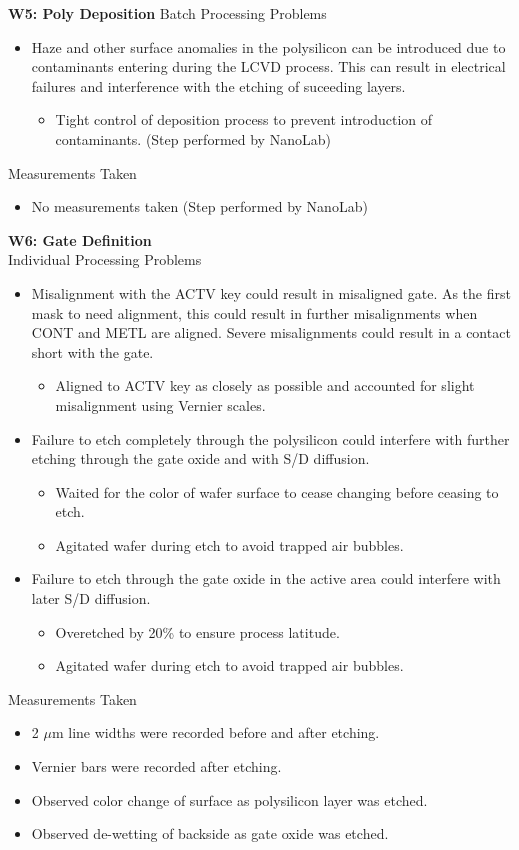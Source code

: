 \documentclass{article}
\begin{document}
\textbf{W5: Poly Deposition}
Batch Processing Problems
\begin{itemize}
\item Haze and other surface anomalies in the polysilicon can be introduced due to contaminants entering during the LCVD process. This can result in electrical failures and interference with the etching of suceeding layers.
	\begin{itemize}
	\item Tight control of deposition process to prevent introduction of contaminants. (Step performed by NanoLab)
	\end{itemize}
\end{itemize}
Measurements Taken
\begin{itemize}
\item No measurements taken (Step performed by NanoLab)
\end{itemize}

\textbf{W6: Gate Definition} \\
Individual Processing Problems
\begin{itemize}
\item Misalignment with the ACTV key could result in misaligned gate. As the first mask to need alignment, this could result in further misalignments when CONT and METL are aligned. Severe misalignments could result in a contact short with the gate.
	\begin{itemize}
	\item Aligned to ACTV key as closely as possible and accounted for slight misalignment using Vernier scales.
	\end{itemize}
\item Failure to etch completely through the polysilicon could interfere with further etching through the gate oxide and with S/D diffusion.
	\begin{itemize}
	\item Waited for the color of wafer surface to cease changing before ceasing to etch.
	\item Agitated wafer during etch to avoid trapped air bubbles.
	\end{itemize}
\item Failure to etch through the gate oxide in the active area could interfere with later S/D diffusion.
	\begin{itemize}
	\item Overetched by 20\% to ensure process latitude.  
	\item Agitated wafer during etch to avoid trapped air bubbles.
	\end{itemize}
\end{itemize}
Measurements Taken
\begin{itemize}
\item 2 $\mu$m line widths were recorded before and after etching.
\item Vernier bars were recorded after etching.
\item Observed color change of surface as polysilicon layer was etched.
\item Observed de-wetting of backside as gate oxide was etched.
\end{itemize}
\end{document}
